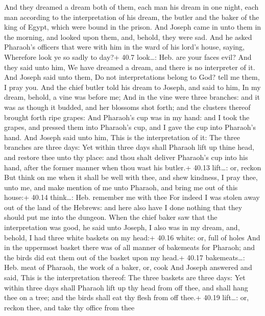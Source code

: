  And they dreamed a dream both of them, each man his dream
in one night, each man according to the interpretation of his dream, the
butler and the baker of the king of Egypt, which were bound in the
prison.  And Joseph came in unto them in the morning, and
looked upon them, and, behold, they were sad.  And he asked
Pharaoh's officers that were with him in the ward of his lord's house,
saying, Wherefore look ye so sadly to day?+ 40.7 look\ldots: Heb. are
your faces evil?  And they said unto him, We have dreamed a
dream, and there is no interpreter of it. And Joseph said unto them, Do
not interpretations belong to God? tell me them, I pray you.
 And the chief butler told his dream to Joseph, and said to
him, In my dream, behold, a vine was before me;  And in the
vine were three branches: and it was as though it budded, and her
blossoms shot forth; and the clusters thereof brought forth ripe grapes:
 And Pharaoh's cup was in my hand: and I took the grapes,
and pressed them into Pharaoh's cup, and I gave the cup into Pharaoh's
hand.  And Joseph said unto him, This is the interpretation
of it: The three branches are three days:  Yet within three
days shall Pharaoh lift up thine head, and restore thee unto thy place:
and thou shalt deliver Pharaoh's cup into his hand, after the former
manner when thou wast his butler.+ 40.13 lift\ldots: or, reckon
 But think on me when it shall be well with thee, and shew
kindness, I pray thee, unto me, and make mention of me unto Pharaoh, and
bring me out of this house:+ 40.14 think\ldots: Heb. remember me with
thee  For indeed I was stolen away out of the land of the
Hebrews: and here also have I done nothing that they should put me into
the dungeon.  When the chief baker saw that the
interpretation was good, he said unto Joseph, I also was in my dream,
and, behold, I had three white baskets on my head:+ 40.16 white: or,
full of holes  And in the uppermost basket there was of all
manner of bakemeats for Pharaoh; and the birds did eat them out of the
basket upon my head.+ 40.17 bakemeats\ldots: Heb. meat of Pharaoh, the
work of a baker, or, cook  And Joseph answered and said,
This is the interpretation thereof: The three baskets are three days:
 Yet within three days shall Pharaoh lift up thy head from
off thee, and shall hang thee on a tree; and the birds shall eat thy
flesh from off thee.+ 40.19 lift\ldots: or, reckon thee, and take thy
office from thee

